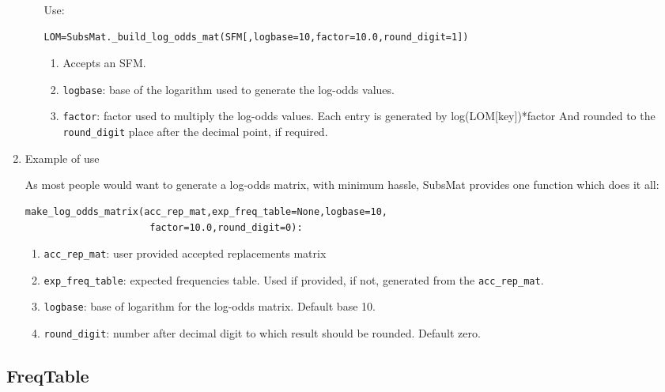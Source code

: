\documentclass{report}
\begin{document}
\begin{enumerate}
\begin{enumerate}
   Use:
\begin{verbatim}
LOM=SubsMat._build_log_odds_mat(SFM[,logbase=10,factor=10.0,round_digit=1])
\end{verbatim}

   \begin{enumerate}
     \item Accepts an SFM.

     \item \verb|logbase|: base of the logarithm used to generate the log-odds values.

     \item \verb|factor|: factor used to multiply the log-odds values.  Each entry is generated by log(LOM[key])*factor And rounded to the \verb|round_digit| place after the decimal point, if required.

\end{enumerate}

\end{enumerate}

\item Example of use

As most people would want to generate a log-odds matrix, with minimum hassle, SubsMat provides one function which does it all:

\begin{verbatim}
make_log_odds_matrix(acc_rep_mat,exp_freq_table=None,logbase=10,
                      factor=10.0,round_digit=0):
\end{verbatim}

\begin{enumerate}
  \item \verb|acc_rep_mat|: user provided accepted replacements matrix
  \item \verb|exp_freq_table|: expected frequencies table. Used if provided, if not, generated from the \verb|acc_rep_mat|.
  \item \verb|logbase|: base of logarithm for the log-odds matrix. Default base 10.
  \item \verb|round_digit|: number after decimal digit to which result should be rounded. Default zero.
\end{enumerate}

\end{enumerate}

\subsection{FreqTable}
\label{sec:freq_table}
\end{document}
